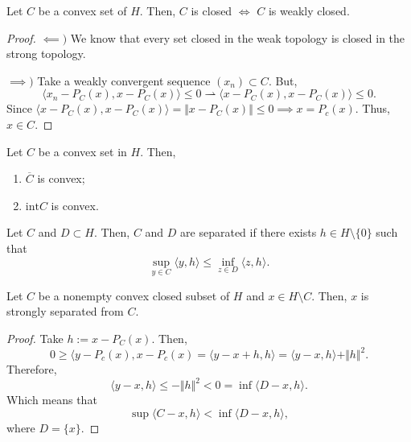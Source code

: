 \begin{theorem}
    Let $C$ be a convex set of $H$. Then, $C$ is closed $\iff$ $C$ is weakly closed.
\end{theorem}

\begin{proof}
    $\impliedby)$  We know that every set closed in the weak topology is closed in the strong topology.

    $\implies)$ Take a weakly convergent sequence $(x_n) \subset C$. But,
    \begin{displaymath}
        \langle x_n - P_C(x), x - P_C(x) \rangle \leq 0 \rightharpoonup
        \langle x - P_C(x), x - P_C(x) \rangle \leq 0.
    \end{displaymath}
    Since 
    $\langle x - P_C(x), x - P_C(x) \rangle = \Vert x - P_C(x)\Vert \leq 0 \implies x = P_c(x)$.
    Thus, $x \in C$.

\end{proof}

\begin{proposition}
    Let $C$ be a convex set in $H$. Then,
    \begin{enumerate}
        \item $\overline C$ is convex;
        \item $\text{int} C$ is convex.
    \end{enumerate}
\end{proposition}

\begin{definition}
    Let $C$ and $D \subset H$. Then, $C$ and $D$ are separated if there exists
    $h \in H \setminus \{0\}$ such that
    \begin{displaymath}
        \sup_{y \in C} \langle y, h \rangle \leq \inf_{z \in D} \langle z, h \rangle.
    \end{displaymath}
\end{definition}

\begin{theorem}
    Let $C$ be a nonempty convex closed subset of $H$ and $x \in H \setminus C$. Then,
    $x$ is strongly separated from $C$.
\end{theorem}

\begin{proof}
    Take $h := x - P_C(x)$. Then,
    \begin{displaymath}
        0 \geq \langle y - P_c(x), x - P_c(x) = \langle y - x + h, h \rangle =
        \langle y - x, h \rangle  + \Vert h \Vert^2.
    \end{displaymath}
    Therefore,
    \begin{displaymath}
        \langle y - x, h \rangle \leq - \Vert h \Vert^2 < 0 = \inf \langle D - x, h \rangle.
    \end{displaymath}
    Which means that 
    \begin{displaymath}
        \sup \langle C - x, h \rangle < \inf \langle D - x, h \rangle,
    \end{displaymath}
    where $D = \{x\}$.
    
\end{proof}

